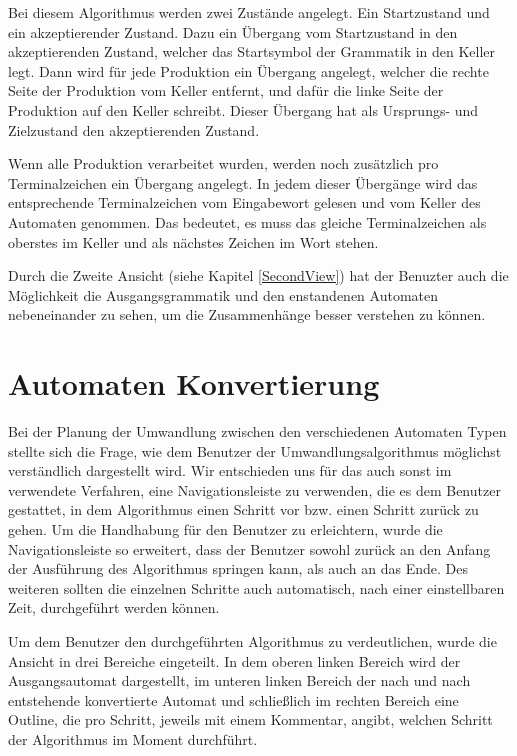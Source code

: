 Bei diesem Algorithmus werden zwei Zustände angelegt. Ein Startzustand und ein
akzeptierender Zustand. Dazu ein Übergang vom Startzustand in den
akzeptierenden Zustand, welcher das Startsymbol der Grammatik in den Keller
legt. Dann wird für jede Produktion ein Übergang angelegt, welcher die rechte
Seite der Produktion vom Keller entfernt, und dafür die linke Seite der
Produktion auf den Keller schreibt. Dieser Übergang hat als
Ursprungs- und Zielzustand den akzeptierenden Zustand.\vspace{10pt}

Wenn alle Produktion verarbeitet wurden, werden noch zusätzlich pro
Terminalzeichen ein Übergang angelegt. In jedem dieser Übergänge wird das
entsprechende Terminalzeichen vom Eingabewort gelesen und vom Keller des
Automaten genommen. Das bedeutet, es muss das gleiche Terminalzeichen als
oberstes im Keller  und als nächstes Zeichen im Wort stehen.\vspace{10pt}

Durch die Zweite Ansicht (siehe Kapitel \ref{SecondView}) hat der Benuzter auch
die Möglichkeit die Ausgangsgrammatik und den enstandenen Automaten nebeneinander
zu sehen, um die Zusammenhänge besser verstehen zu können.\vspace{10pt}


\section{Automaten Konvertierung}\label{ConverToMachine}

Bei der Planung der Umwandlung zwischen den verschiedenen Automaten Typen stellte
sich die Frage, wie dem Benutzer der Umwandlungsalgorithmus möglichst
verständlich dargestellt wird. Wir entschieden uns für das auch sonst im \gtitool
verwendete Verfahren, eine Navigationsleiste zu verwenden, die es dem Benutzer
gestattet, in dem Algorithmus einen Schritt vor bzw. einen Schritt zurück zu
gehen. Um die Handhabung für den Benutzer zu erleichtern, wurde die
Navigationsleiste so erweitert, dass der Benutzer sowohl zurück an den Anfang der
Ausführung des Algorithmus springen kann, als auch an das Ende. Des weiteren
sollten die einzelnen Schritte auch automatisch, nach einer einstellbaren Zeit,
durchgeführt werden können.\vspace{10pt}

Um dem Benutzer den durchgeführten Algorithmus zu verdeutlichen, wurde die
Ansicht in drei Bereiche eingeteilt. In dem oberen linken Bereich wird der
Ausgangsautomat dargestellt, im unteren linken Bereich der nach und nach
entstehende konvertierte Automat und schließlich im rechten Bereich eine
Outline, die pro Schritt, jeweils mit einem Kommentar, angibt, welchen Schritt
der Algorithmus im Moment durchführt.\vspace{10pt}

